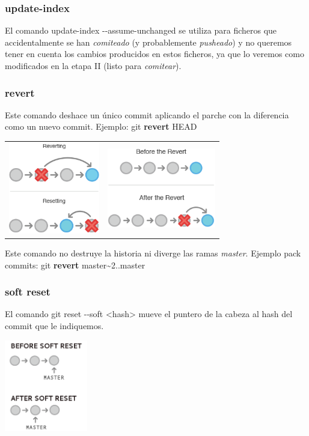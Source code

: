 \frame
{
\frametitle{update-index}
El comando update-index -{}-assume-unchanged se utiliza para ficheros que accidentalmente se han \textit{comiteado} (y probablemente \textit{pusheado}) y no queremos tener en cuenta los cambios producidos en estos ficheros, ya que lo veremos como modificados en la etapa II (listo para \textit{comitear}).
}

\frame
{
\frametitle{revert}
  Este comando deshace un único commit aplicando el parche con la diferencia como un nuevo commit. Ejemplo: git \textbf{revert} HEAD
 \begin{tabular}{p{4cm}|p{4cm}}\\
    \includegraphics[height=4cm]{imgs/revert-vs-reset.png}&
    \includegraphics[height=3.5cm]{imgs/revert-sample.png}\\
 \end{tabular}

 Este comando no destruye la historia ni diverge las ramas \textit{master}. Ejemplo pack commits: git \textbf{revert} master\textasciitilde2..master
}

\frame
{
\frametitle{soft reset}
 El comando git reset -{}-soft <hash> mueve el puntero de la cabeza al hash del commit que le indiquemos.\\
 \begin{center}
    \includegraphics[height=4cm]{imgs/soft-reset.png}
 \end{center}
}

